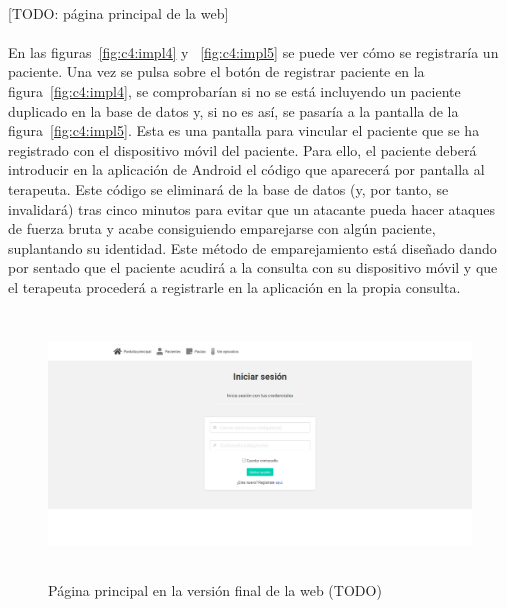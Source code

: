 \paragraph{}
[TODO: página principal de la web]

\paragraph{}
En las figuras~\ref{fig:c4:impl4} y ~\ref{fig:c4:impl5} se puede ver cómo se registraría un paciente. Una vez se pulsa sobre el botón de registrar paciente en la figura~\ref{fig:c4:impl4}, se comprobarían si no se está incluyendo un paciente duplicado en la base de datos y, si no es así, se pasaría a la pantalla de la figura~\ref{fig:c4:impl5}. Esta es una pantalla para vincular el paciente que se ha registrado con el dispositivo móvil del paciente. Para ello, el paciente deberá introducir en la aplicación de Android el código que aparecerá por pantalla al terapeuta. Este código se eliminará de la base de datos (y, por tanto, se invalidará) tras cinco minutos para evitar que un atacante pueda hacer ataques de fuerza bruta y acabe consiguiendo emparejarse con algún paciente, suplantando su identidad. Este método de emparejamiento está diseñado dando por sentado que el paciente acudirá a la consulta con su dispositivo móvil y que el terapeuta procederá a registrarle en la aplicación en la propia consulta.

\begin{figure}[H]
    \centering
    \includegraphics[height=7cm, width=\textwidth]{Imagenes/14-iniciarSesion.png}
    \caption[Página principal en la versión final de la web (TODO)]{Página principal en la versión final de la web (TODO)}
    \label{fig:c4:impl3}
\end{figure}

